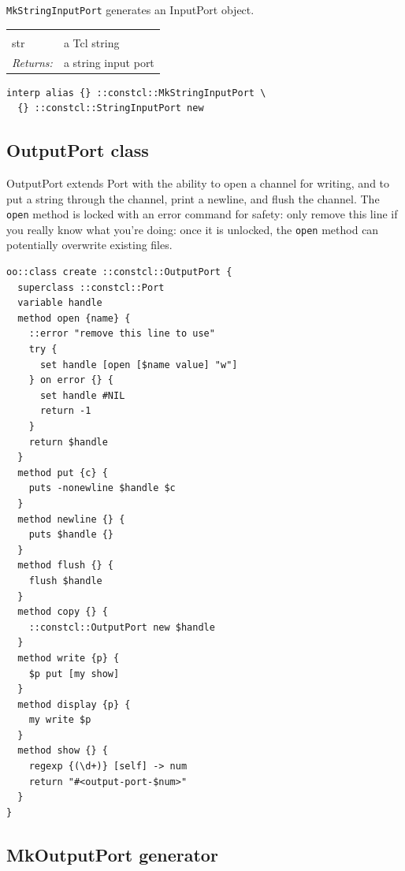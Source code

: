 \documentclass[twoside]{report}
\begin{document}
\texttt{MkStringInputPort} generates an InputPort object.

\noindent\begin{tabular}{ |p{1.9cm} p{8cm}| }
\hline
\rowcolor[HTML]{CCCCCC} \multicolumn{2}{|l|}{\bf MkStringInputPort (internal)} \\
str & a Tcl string \\
\textit{Returns:} & a string input port \\
\hline
\end{tabular}

\begin{lstlisting}
interp alias {} ::constcl::MkStringInputPort \
  {} ::constcl::StringInputPort new
\end{lstlisting}

\subsection{OutputPort class}
\label{outputport-class}

OutputPort extends Port with the ability to open a channel for writing, and to put a string through the channel, print a newline, and flush the channel. The \texttt{open} method is locked with an error command for safety: only remove this line if you really know what you're doing: once it is unlocked, the \texttt{open} method can potentially overwrite existing files.

\begin{lstlisting}
oo::class create ::constcl::OutputPort {
  superclass ::constcl::Port
  variable handle
  method open {name} {
    ::error "remove this line to use"
    try {
      set handle [open [$name value] "w"]
    } on error {} {
      set handle #NIL
      return -1
    }
    return $handle
  }
  method put {c} {
    puts -nonewline $handle $c
  }
  method newline {} {
    puts $handle {}
  }
  method flush {} {
    flush $handle
  }
  method copy {} {
    ::constcl::OutputPort new $handle
  }
  method write {p} {
    $p put [my show]
  }
  method display {p} {
    my write $p
  }
  method show {} {
    regexp {(\d+)} [self] -> num
    return "#<output-port-$num>"
  }
}
\end{lstlisting}

\subsection{MkOutputPort generator}
\label{mkoutputport-generator}
\end{document}
